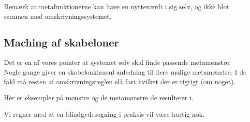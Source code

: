 \documentclass[oneside]{memoir}
\theoremstyle{definition}
\begin{document}
Bemærk at metafunktionerne kan have en nytteværdi i sig selv, og ikke blot
sammen med omskrivningssystemet.


\subsection{Maching af skabeloner}






Det er en af vores pointer at systemet selv skal finde passende
metamønstre. Nogle gange giver en skabelonklausul anledning til flere
mulige metamønstre. I de fald må resten af omskrivningsreglen slå fast hvilket
der er rigtigt (om noget).

Her er eksempler på mønstre og de metamønstre de resulterer i.

Vi regner med at en blindgydesøgning i praksis vil være hurtig nok.
\end{document}
